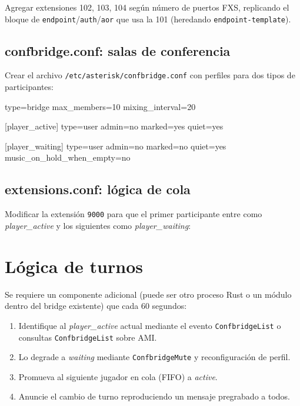 Agregar extensiones 102, 103, 104 según número de puertos FXS, replicando el bloque de \texttt{endpoint}/\texttt{auth}/\texttt{aor} que usa la 101 (heredando \texttt{endpoint-template}).

\subsection{confbridge.conf: salas de conferencia}

Crear el archivo \texttt{/etc/asterisk/confbridge.conf} con perfiles para dos tipos de participantes:

\begin{astcode}
type=bridge
max_members=10
mixing_interval=20

[player_active]
type=user
admin=no
marked=yes
quiet=yes

[player_waiting]
type=user
admin=no
marked=no
quiet=yes
music_on_hold_when_empty=no
\end{astcode}

\subsection{extensions.conf: lógica de cola}

Modificar la extensión \texttt{9000} para que el primer participante entre como \emph{player\_active} y los siguientes como \emph{player\_waiting}:


\section{Lógica de turnos}

Se requiere un componente adicional (puede ser otro proceso Rust o un módulo dentro del bridge existente) que cada 60 segundos:

\begin{enumerate}
  \item Identifique al \emph{player\_active} actual mediante el evento \texttt{ConfbridgeList} o consultas \texttt{ConfbridgeList} sobre AMI.
  \item Lo degrade a \emph{waiting} mediante \texttt{ConfbridgeMute} y reconfiguración de perfil.
  \item Promueva al siguiente jugador en cola (FIFO) a \emph{active}.
  \item Anuncie el cambio de turno reproduciendo un mensaje pregrabado a todos.
\end{enumerate}

